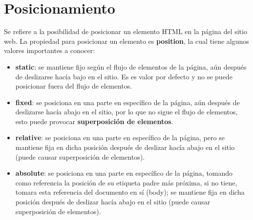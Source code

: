 \section{Posicionamiento}

Se refiere a la posibilidad de posicionar un elemento HTML en la página del sitio web. La propiedad para posicionar un elemento es \textbf{position}, la cual tiene algunos valores importantes a conocer:
\begin{itemize}
    \item \textbf{static}: se mantiene fijo según el flujo de elementos de la página, aún después de deslizarse hacía bajo en el sitio. Es es valor por defecto y no se puede posicionar fuera del flujo de elementos.
    \item \textbf{fixed}: se posiciona en una parte en específico de la página, aún después de deslizarse hacía abajo en el sitio, por lo que no sigue el flujo de elementos, esto puede provocar \textbf{superposición de elementos}.
    \item \textbf{relative}: se posiciona en una parte en específico de la página, pero se mantiene fija en dicha posición después de deslizar hacía abajo en el sitio (puede causar superposición de elementos).
    \item \textbf{absolute}: se posiciona en una parte en específico de la página, tomando como referencia la posición de su etiqueta padre más próxima, si no tiene, tomara esta referencia del documento en sí (body); se mantiene fija en dicha posición después de deslizar hacía abajo en el sitio (puede causar superposición de elementos).
\end{itemize}

